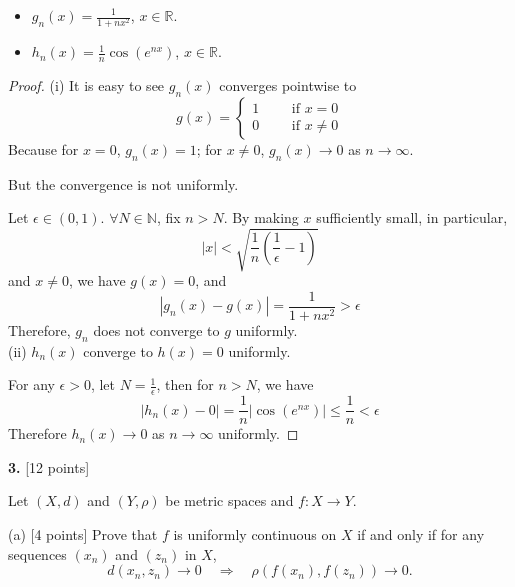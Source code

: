 \documentclass[11pt,a4paper]{amsart}
\def\R{{\mathbb R}}
\def\N{{\mathbb N}}
\def\e{\epsilon}
\def\r{\rho}
\begin{document}
\medskip

\begin{itemize}

\item[(i)] $\displaystyle{g_n(x)= \frac{1}{1+nx^2}}$,  \quad $x\in\R$.

\medskip

\item[(ii)] $\displaystyle{h_n(x)= \frac{1}{n}\cos(e^{nx})}$,  \quad $x\in\R$.

\end{itemize}

\begin{proof}
(i) It is easy to see $g_n(x)$ converges pointwise to
\[
g(x) = \begin{cases}
      1 \qquad\textrm{ if } x = 0 \\
      0 \qquad\textrm{ if } x\neq 0
    \end{cases}
\]
Because for $x=0$, $g_n(x)=1$; for $x\neq 0$, $g_n(x)\to 0$ as $n\to\infty$.

But the convergence is not uniformly.

Let $\e \in (0,1)$. $\forall N\in\N$,
fix $n>N$. By making $x$ sufficiently small, in particular,
$$ |x| < \sqrt{\frac{1}{n}\left(\frac{1}{\e}-1\right)} $$
and $x\neq 0$, we have $g(x)=0$, and
$$ |g_n(x) - g(x)| = \frac{1}{1+nx^2} > \e $$
Therefore, $g_n$ does not converge to $g$ uniformly.\\

(ii) $h_n(x)$ converge to $h(x)=0$ uniformly.

For any $\e>0$, let $N = \frac{1}{\e}$, then for $n>N$, we have
$$ |h_n(x) - 0| = \frac{1}{n} |\cos(e^{nx})| \le \frac{1}{n} < \e $$
Therefore $h_n(x)\to 0$ as $n\to\infty$ uniformly.
\end{proof}

\medskip



\bigskip


{\bf 3.} [12 points]

Let $(X,d)$ and $(Y,\r)$ be metric spaces and $f:X\rightarrow Y$.

\medskip

(a)  [4 points] Prove that $f$ is uniformly continuous on $X$ if and only if for any sequences
$(x_n)$ and $(z_n)$ in $X$,
$$ d(x_n,z_n) \rightarrow 0 \quad\Longrightarrow\quad \r(f(x_n),f(z_n)) \rightarrow 0. $$
\end{document}
